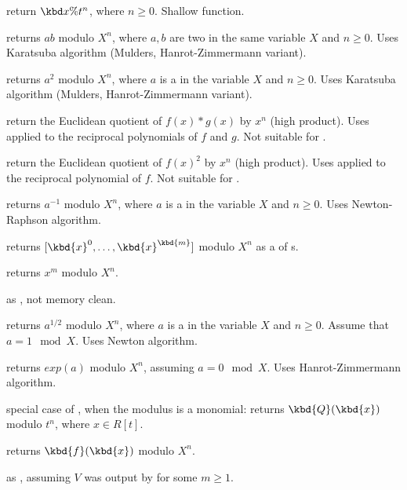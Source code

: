 
 return $\kbd{x \% } t^n$,
where $n\geq 0$. Shallow function.

 returns $a b$ modulo $X^n$,
where $a,b$ are two  in the same variable $X$ and $n \geq 0$. Uses
Karatsuba algorithm (Mulders, Hanrot-Zimmermann variant).

 returns $a^2$ modulo $X^n$,
where $a$ is a  in the variable $X$ and $n \geq 0$. Uses
Karatsuba algorithm (Mulders, Hanrot-Zimmermann variant).

 return the Euclidean quotient
of $f(x)*g(x)$ by $x^n$ (high product). Uses  applied to
the reciprocal polynomials of $f$ and $g$. Not suitable for .

 return the Euclidean quotient
of $f(x)^2$ by $x^n$ (high product). Uses  applied to
the reciprocal polynomial of $f$. Not suitable for .

 returns $a^{-1}$ modulo $X^n$,
where $a$ is a  in the variable $X$ and $n \geq 0$. Uses
Newton-Raphson algorithm.

 returns $[\kbd{x}^0,
\dots, \kbd{x}^\kbd{m}]$ modulo $X^n$ as a  of s.

 returns $x^m$ modulo
$X^n$.

 as ,
not memory clean.

 returns $a^{1/2}$ modulo $X^n$,
where $a$ is a  in the variable $X$ and $n \geq 0$.
Assume that $a = 1 \mod{X}$. Uses Newton algorithm.

 returns $exp(a)$ modulo $X^n$, assuming
$a = 0 \mod{X}$. Uses Hanrot-Zimmermann algorithm.

 special case of
, when the modulus is a monomial:
returns $\kbd{Q}(\kbd{x})$ modulo $t^n$, where $x \in R[t]$.

 returns $\kbd{f}(\kbd{x})$ modulo
$X^n$.

 as ,
assuming $V$ was output by  for some $m\geq 1$.

